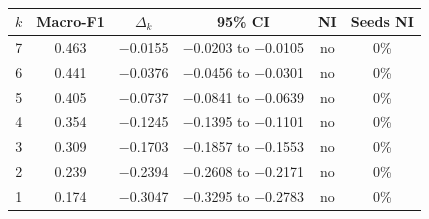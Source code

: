 \begin{table}[t]
\centering
\small
\caption{}
\label{tab:bipolar}
\begin{tabular}{rccccc}
\toprule
$k$ & Macro-F1 & $\Delta_k$ & 95\% CI & NI & Seeds NI \\
\midrule
7 & 0.463 & $-$0.0155 & $-$0.0203 to $-$0.0105 & no & 0\% \\
6 & 0.441 & $-$0.0376 & $-$0.0456 to $-$0.0301 & no & 0\% \\
5 & 0.405 & $-$0.0737 & $-$0.0841 to $-$0.0639 & no & 0\% \\
4 & 0.354 & $-$0.1245 & $-$0.1395 to $-$0.1101 & no & 0\% \\
3 & 0.309 & $-$0.1703 & $-$0.1857 to $-$0.1553 & no & 0\% \\
2 & 0.239 & $-$0.2394 & $-$0.2608 to $-$0.2171 & no & 0\% \\
1 & 0.174 & $-$0.3047 & $-$0.3295 to $-$0.2783 & no & 0\% \\
\bottomrule
\end{tabular}
\end{table}
